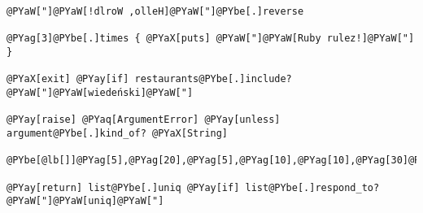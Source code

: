 \begin{Verbatim}[commandchars=@\[\]]
@PYaW["]@PYaW[!dlroW ,olleH]@PYaW["]@PYbe[.]reverse

@PYag[3]@PYbe[.]times { @PYaX[puts] @PYaW["]@PYaW[Ruby rulez!]@PYaW["] }

@PYaX[exit] @PYay[if] restaurants@PYbe[.]include? @PYaW["]@PYaW[wiedeński]@PYaW["]

@PYay[raise] @PYaq[ArgumentError] @PYay[unless] argument@PYbe[.]kind_of? @PYaX[String]

@PYbe[@lb[]]@PYag[5],@PYag[20],@PYag[5],@PYag[10],@PYag[10],@PYag[30]@PYbe[@rb[]]@PYbe[.]sort@PYbe[.]last

@PYay[return] list@PYbe[.]uniq @PYay[if] list@PYbe[.]respond_to? @PYaW["]@PYaW[uniq]@PYaW["]
\end{Verbatim}
